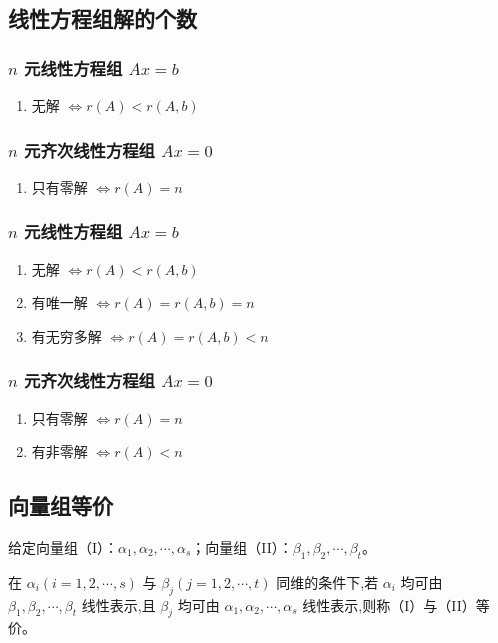 \documentclass[UTF8]{ctexart}
\theoremstyle{remark}
\begin{document}
	\subsection{线性方程组解的个数}
	\subsubsection{\(n\) 元线性方程组 \(Ax = b\)}
	\begin{enumerate}
		\item 无解 \(\Leftrightarrow r(A) < r(A,b)\)
	\end{enumerate}
	\subsubsection{\(n\) 元齐次线性方程组 \(Ax = 0\)}
	\begin{enumerate}
		\item 只有零解 \(\Leftrightarrow r(A) = n\)
	\end{enumerate}
	
	\subsubsection{\(n\) 元线性方程组 \(Ax = b\)}
	\begin{enumerate}
		\item 无解 \(\Leftrightarrow r(A) < r(A,b)\)
		\item 有唯一解 \(\Leftrightarrow r(A) = r(A,b) = n\)
		\item 有无穷多解 \(\Leftrightarrow r(A) = r(A,b) < n\)
	\end{enumerate}
	\subsubsection{\(n\) 元齐次线性方程组 \(Ax = 0\)}
	\begin{enumerate}
		\item 只有零解 \(\Leftrightarrow r(A) = n\)
		\item 有非零解 \(\Leftrightarrow r(A) < n\)
	\end{enumerate}
	
	\subsection{向量组等价}
	给定向量组（I）：\(\alpha_1,\alpha_2,\cdots,\alpha_s\)；向量组（II）：\(\beta_1,\beta_2,\cdots,\beta_t\)。
	
	在 \(\alpha_i (i = 1,2,\cdots,s)\) 与 \(\beta_j (j = 1,2,\cdots,t)\) 同维的条件下,若 \(\alpha_i\) 均可由 \(\beta_1,\beta_2,\cdots,\beta_t\) 线性表示,且 \(\beta_j\) 均可由 \(\alpha_1,\alpha_2,\cdots,\alpha_s\) 线性表示,则称（I）与（II）等价。
	
\end{document}
